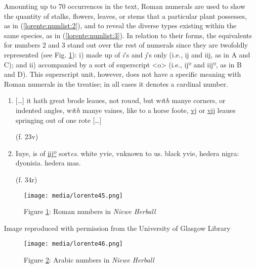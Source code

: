 \documentclass{article}
\begin{document}
Amounting up to 70 occurrences in the text, Roman numerals are used to
show the quantity of stalks, flowers, leaves, or stems that a particular
plant possesses, as in (\ref{lorente:numlist:2}), and to reveal the diverse types existing
within the same species, as in (\ref{lorente:numlist:3}). In relation to their forms, the
equivalents for numbers 2 and 3 stand out over the rest of numerals
since they are twofoldly represented (see Fig. \ref{fig:lorente45}): i) made up of
\emph{i}'s and \emph{j}'s only (i.e., ij and iij, as in A and C); and ii)
accompanied by a sort of superscript \textless o\textgreater{} (i.e., ijº
and iijº, as in B and D). This superscript unit, however, does not have a
specific meaning with Roman numerals in the treatise; in all cases it denotes a cardinal number.

\begin{enumerate}
\def\labelenumi{(\arabic{enumi})}
\setcounter{enumi}{1}
\item\label{lorente:numlist:2}
{[}\ldots{]} it hath great brode leaues, not rou\emph{n}d, but
w\emph{i}t\emph{h} manye corners, or indented angles, w\emph{i}t\emph{h}
manye vaines, like to a horse foote, \uline{vj} or \uline{vij} leaues
springing out of one rote {[}\ldots{]} 
\begin{flushright}
  (f. 23v)  
\end{flushright}

\vspace{1em}

\item\label{lorente:numlist:3}
Iuye, is of \uline{iijº} sort\emph{es}. white yvie, vnknown to us.
black yvie, hedera nigra: dyonisia. hedera mas. 
\begin{flushright}
    (f. 34r)
\end{flushright}
\end{enumerate}

\begin{figure}[H]
  \centering
    \texttt{[image: media/lorente45.png]}
    \caption{Figure \ref{fig:lorente45}: Roman numbers in \emph{Niewe Herball}}
    \label{fig:lorente45}
    \end{figure}


 Image reproduced with permission from the University of Glasgow Library 


 
\begin{figure}[H]
  \centering
    \texttt{[image: media/lorente46.png]}
    \caption{Figure \ref{fig:lorente46}: Arabic numbers in \emph{Niewe Herball}}
    \label{fig:lorente46}
    \end{figure}
\end{document}
